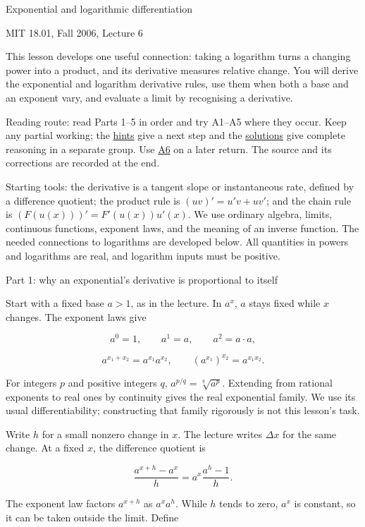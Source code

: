 \documentclass[
  11pt,
]{article}
\author{}
\date{}
\begin{document}
Exponential and logarithmic differentiation

MIT 18.01, Fall 2006, Lecture 6

This lesson develops one useful connection: taking a logarithm turns a
changing power into a product, and its derivative measures relative
change. You will derive the exponential and logarithm derivative rules,
use them when both a base and an exponent vary, and evaluate a limit by
recognising a derivative.

Reading route: read Parts 1--5 in order and try A1--A5 where they occur.
Keep any partial working; the \protect\hyperlink{hints}{hints} give a
next step and the \protect\hyperlink{solutions}{solutions} give complete
reasoning in a separate group. Use \protect\hyperlink{task-a6}{A6} on a
later return. The source and its corrections are recorded at the end.

Starting tools: the derivative is a tangent slope or instantaneous rate,
defined by a difference quotient; the product rule is \((uv)'=u'v+uv'\);
and the chain rule is \((F(u(x)))'=F'(u(x))u'(x)\). We use ordinary
algebra, limits, continuous functions, exponent laws, and the meaning of
an inverse function. The needed connections to logarithms are developed
below. All quantities in powers and logarithms are real, and logarithm
inputs must be positive.

Part 1: why an exponential's derivative is proportional to itself

Start with a fixed base \(a>1\), as in the lecture. In \(a^x\), \(a\)
stays fixed while \(x\) changes. The exponent laws give

\[
a^0=1,\qquad a^1=a,\qquad a^2=a\cdot a,
\]

\[
a^{x_1+x_2}=a^{x_1}a^{x_2},\qquad (a^{x_1})^{x_2}=a^{x_1x_2}.
\]

For integers \(p\) and positive integers \(q\),
\(a^{p/q}=\sqrt[q]{a^p}\). Extending from rational exponents to real
ones by continuity gives the real exponential family. We use its usual
differentiability; constructing that family rigorously is not this
lesson's task.

Write \(h\) for a small nonzero change in \(x\). The lecture writes
\(\Delta x\) for the same change. At a fixed \(x\), the difference
quotient is

\[
\frac{a^{x+h}-a^x}{h}
=a^x\frac{a^h-1}{h}.
\]

The exponent law factors \(a^{x+h}\) as \(a^xa^h\). While \(h\) tends to
zero, \(a^x\) is constant, so it can be taken outside the limit. Define
\end{document}
